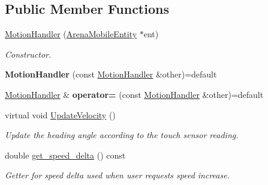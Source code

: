 \subsection*{Public Member Functions}
\begin{DoxyCompactItemize}
\item 
\mbox{\label{class_motion_handler_a48c0070bfda6acb8a7493eb7fe1200c4}} 
\mbox{\hyperlink{class_motion_handler_a48c0070bfda6acb8a7493eb7fe1200c4}{Motion\+Handler}} (\mbox{\hyperlink{class_arena_mobile_entity}{Arena\+Mobile\+Entity}} $\ast$ent)
\begin{DoxyCompactList}\small\item\em Constructor. \end{DoxyCompactList}\item 
\mbox{\label{class_motion_handler_a91dc98beab9d5ccce6b6c18ce32c0488}} 
{\bfseries Motion\+Handler} (const \mbox{\hyperlink{class_motion_handler}{Motion\+Handler}} \&other)=default
\item 
\mbox{\label{class_motion_handler_ad45188f2d9794fd2b257d586a7b522e6}} 
\mbox{\hyperlink{class_motion_handler}{Motion\+Handler}} \& {\bfseries operator=} (const \mbox{\hyperlink{class_motion_handler}{Motion\+Handler}} \&other)=default
\item 
\mbox{\label{class_motion_handler_ad9bfac3d0ec3cec1d607f41475886c3c}} 
virtual void \mbox{\hyperlink{class_motion_handler_ad9bfac3d0ec3cec1d607f41475886c3c}{Update\+Velocity}} ()
\begin{DoxyCompactList}\small\item\em Update the heading angle according to the touch sensor reading. \end{DoxyCompactList}\item 
\mbox{\label{class_motion_handler_ada53f0d6e25d759fc3f45cc55d440177}} 
double \mbox{\hyperlink{class_motion_handler_ada53f0d6e25d759fc3f45cc55d440177}{get\+\_\+speed\+\_\+delta}} () const
\begin{DoxyCompactList}\small\item\em Getter for speed delta used when user requests speed increase. \end{DoxyCompactList}\item 
\mbox{\label{class_motion_handler_a908b330346b3fe969684106bd5c7619d}} 

\end{DoxyCompactItemize}
